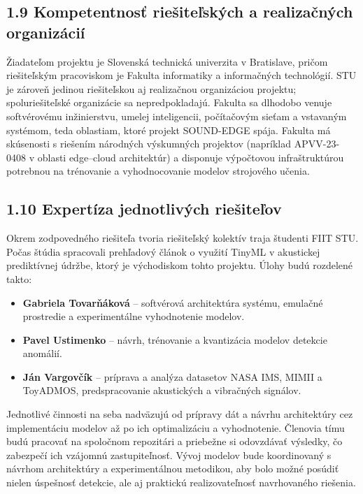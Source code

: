 \documentclass[10pt,a4paper]{article}
\begin{document}
\subsection*{1.9 Kompetentnosť riešiteľských
a realizačných organizácií}

Žiadateľom projektu je Slovenská technická univerzita v Bratislave, pričom riešiteľským pracoviskom je Fakulta informatiky a informačných technológií. STU je zároveň jedinou riešiteľskou aj realizačnou organizáciou projektu; spoluriešiteľské organizácie sa nepredpokladajú. Fakulta sa dlhodobo venuje softvérovému inžinierstvu, umelej inteligencii, počítačovým sieťam a vstavaným systémom, teda oblastiam, ktoré projekt SOUND-EDGE spája. Fakulta má skúsenosti s riešením národných výskumných projektov (napríklad APVV-23-0408 v oblasti edge–cloud architektúr) a disponuje výpočtovou infraštruktúrou potrebnou na trénovanie a vyhodnocovanie modelov strojového učenia.

\subsection*{1.10 Expertíza jednotlivých riešiteľov}

Okrem zodpovedného riešiteľa tvoria riešiteľský kolektív traja študenti FIIT STU. Počas štúdia spracovali prehľadový článok o využití TinyML v akustickej prediktívnej údržbe, ktorý je východiskom tohto projektu. Úlohy budú rozdelené takto:

\begin{itemize}[leftmargin=1.5em, itemsep=2pt, topsep=2pt]
\item \textbf{Gabriela Tovarňáková} -- softvérová architektúra systému, emulačné prostredie a experimentálne vyhodnotenie modelov.
\item \textbf{Pavel Ustimenko} -- návrh, trénovanie a kvantizácia modelov detekcie anomálií.
\item \textbf{Ján Vargovčík} -- príprava a analýza datasetov NASA IMS, MIMII a ToyADMOS, predspracovanie akustických a vibračných signálov.
\end{itemize}

Jednotlivé činnosti na seba nadväzujú od prípravy dát a návrhu architektúry cez implementáciu modelov až po ich optimalizáciu a vyhodnotenie. Členovia tímu budú pracovať na spoločnom repozitári a priebežne si odovzdávať výsledky, čo zabezpečí ich vzájomnú zastupiteľnosť. Vývoj modelov bude koordinovaný s návrhom architektúry a experimentálnou metodikou, aby bolo možné posúdiť nielen úspešnosť detekcie, ale aj praktickú realizovateľnosť navrhovaného riešenia.
\end{document}
